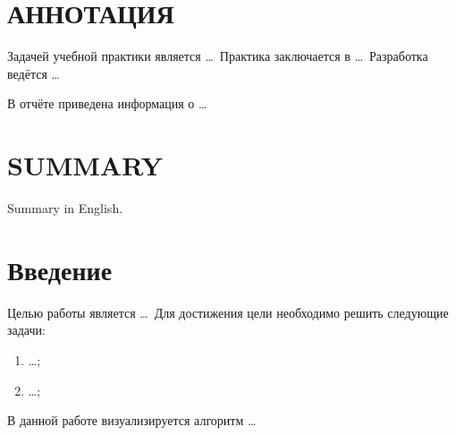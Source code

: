 \newpage

\section*{АННОТАЦИЯ}
\begin{minipage}[t][0.4\textheight][t]{0.9\linewidth}
	\setlength{\parindent}{1.25cm}
	\indent
	Задачей учебной практики является \ldots\ Практика заключается в \ldots\ Разработка ведётся \ldots\
	
	В отчёте приведена информация о \ldots\
\end{minipage}

\section*{SUMMARY}
\begin{minipage}[t][0.4\textheight][t]{0.9\linewidth}
	\setlength{\parindent}{1.25cm}
	\indent
	Summary in English.
\end{minipage}

\newpage

\let \savenumberline \numberline
\def \numberline#1{\savenumberline{#1.}}

\tableofcontents

\newpage

\section*{Введение}

Целью работы является \ldots\ Для достижения цели необходимо решить следующие задачи:

\begin{enumerate}
	\item \ldots;
	\item \ldots;
\end{enumerate}

В данной работе визуализируется алгоритм \ldots

\newpage